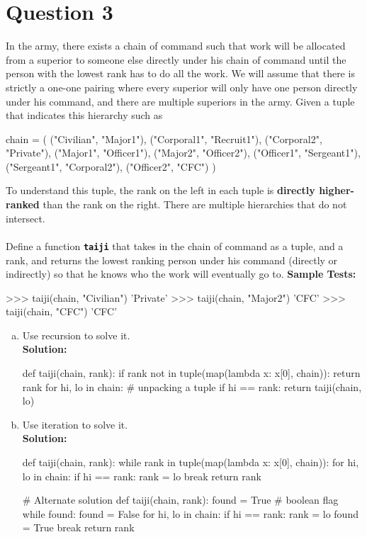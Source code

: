 \section{Question 3}
In the army, there exists a chain of command such that work will be allocated from a
superior to someone else directly under his chain of command until the person with the lowest
rank has to do all the work. We will assume that there is strictly a one-one pairing where every
superior will only have one person directly under his command, and there are multiple
superiors in the army. Given a tuple that indicates this hierarchy such as
\begin{python}
chain = (
    ("Civilian", "Major1"), ("Corporal1", "Recruit1"),
    ("Corporal2", "Private"), ("Major1", "Officer1"),
    ("Major2", "Officer2"), ("Officer1", "Sergeant1"),
    ("Sergeant1", "Corporal2"), ("Officer2", "CFC")
    )
\end{python}
To understand this tuple, the rank on the left in each tuple is \textbf{directly higher-ranked} than the
rank on the right. There are multiple hierarchies that do not intersect. \\ \\
Define a function \texttt{\bfseries taiji} that takes in the chain of command as a tuple, and a rank, and
returns the lowest ranking person under his command (directly or indirectly) so that he knows
who the work will eventually go to.
\textbf{Sample Tests:}
\begin{python}
>>> taiji(chain, "Civilian")
'Private'
>>> taiji(chain, "Major2")
'CFC'
>>> taiji(chain, "CFC")
'CFC'
\end{python}
\begin{enumerate}[(a)]
\item Use recursion to solve it. \\
\textbf{Solution:}
\begin{python}
def taiji(chain, rank):
    if rank not in tuple(map(lambda x: x[0], chain)):
        return rank
    for hi, lo in chain: # unpacking a tuple
        if hi == rank:
            return taiji(chain, lo)
\end{python}
\item Use iteration to solve it. \\
\textbf{Solution:}
\begin{python}
def taiji(chain, rank):
    while rank in tuple(map(lambda x: x[0], chain)):
        for hi, lo in chain:
            if hi == rank:
                rank = lo
                break
    return rank

# Alternate solution
def taiji(chain, rank):
    found = True # boolean flag
    while found:
        found = False
        for hi, lo in chain:
            if hi == rank:
                rank = lo
                found = True
                break
    return rank
\end{python}
\end{enumerate}

